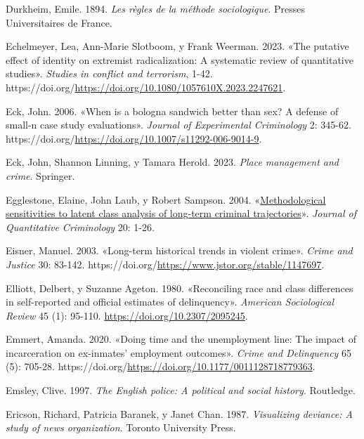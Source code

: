 \documentclass[
  spanish,
  letterpaper,
  DIV=11,
  numbers=noendperiod]{scrreprt}
\newlength{\cslhangindent}
\newenvironment{CSLReferences}[2] %
 {\begin{list}{}{%
  \setlength{\itemindent}{0pt}
  \setlength{\leftmargin}{0pt}
  \setlength{\parsep}{0pt}
  \ifodd #1
   \setlength{\leftmargin}{\cslhangindent}
   \setlength{\itemindent}{-1\cslhangindent}
  \fi
  \setlength{\itemsep}{#2\baselineskip}}}
 {\end{list}}
\begin{document}
\begin{CSLReferences}{1}{0}
Durkheim, Emile. 1894. \emph{Les règles de la méthode sociologique}.
Presses Universitaires de France.

Echelmeyer, Lea, Ann-Marie Slotboom, y Frank Weerman. 2023. {«The
putative effect of identity on extremist radicalization: A systematic
review of quantitative studies»}. \emph{Studies in conflict and
terrorism}, 1-42.
https://doi.org/\url{https://doi.org/10.1080/1057610X.2023.2247621}.

Eck, John. 2006. {«When is a bologna sandwich better than sex? A defense
of small-n case study evaluations»}. \emph{Journal of Experimental
Criminology} 2: 345-62.
https://doi.org/\url{https://doi.org/10.1007/s11292-006-9014-9}.

Eck, John, Shannon Linning, y Tamara Herold. 2023. \emph{Place
management and crime}. Springer.

Egglestone, Elaine, John Laub, y Robert Sampson. 2004.
{«\href{}{Methodological sensitivities to latent class analysis of
long-term criminal trajectories}»}. \emph{Journal of Quantitative
Criminology} 20: 1-26.

Eisner, Manuel. 2003. {«Long-term historical trends in violent crime»}.
\emph{Crime and Justice} 30: 83-142.
https://doi.org/\url{https://www.jstor.org/stable/1147697}.

Elliott, Delbert, y Suzanne Ageton. 1980. {«Reconciling race and class
differences in self-reported and official estimates of delinquency»}.
\emph{American Sociological Review} 45 (1): 95-110.
\url{https://doi.org/10.2307/2095245}.

Emmert, Amanda. 2020. {«Doing time and the unemployment line: The impact
of incarceration on ex-inmates' employment outcomes»}. \emph{Crime and
Delinquency} 65 (5): 705-28.
https://doi.org/\url{https://doi.org/10.1177/0011128718779363}.

Emsley, Clive. 1997. \emph{The English police: A political and social
history}. Routledge.

Ericson, Richard, Patricia Baranek, y Janet Chan. 1987.
\emph{Visualizing deviance: A study of news organization}. Toronto
University Press.


\end{CSLReferences}
\end{document}
